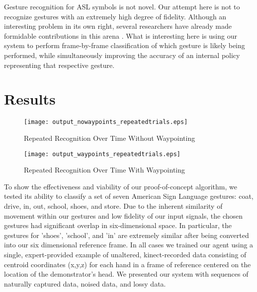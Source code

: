\documentclass[letterpaper]{article}
\begin{document}
Gesture recognition for ASL symbols is not novel.  Our attempt here is not to recognize gestures with an extremely high degree of fidelity.  Although an interesting problem in its own right, several researchers have already made formidable contributions in this arena \cite{HandGestures,HSMMRecognition,POMDPGesture,HoughASL,ASLRealTime,MotionASL}.  What is interesting here is using our system to perform frame-by-frame classification of which gesture is likely being performed, while simultaneously improving the accuracy of an internal policy representing that respective gesture.

\section{Results}
\label{sec:result}

\begin{figure}
\begin{center}
\texttt{[image: output\_nowaypoints\_repeatedtrials.eps]}
\caption{Repeated Recognition Over Time Without Waypointing}
\label{fig:output_nowaypoints_repeatedtrials}
\end{center}
\end{figure}

\begin{figure}
\begin{center}
\texttt{[image: output\_waypoints\_repeatedtrials.eps]}
\caption{Repeated Recognition Over Time With Waypointing}
\label{fig:output_waypoints_repeatedtrials}
\end{center}
\end{figure}

To show the effectiveness and viability of our proof-of-concept algorithm, we tested its ability to classify a set of seven American Sign Language gestures: coat, drive, in, out, school, shoes, and store. Due to the inherent similarity of movement within our gestures and low fidelity of our input signals, the chosen gestures had significant overlap in six-dimensional space. In particular, the gestures for 'shoes', 'school', and 'in' are extremely similar after being converted into our six dimensional reference frame. In all cases we trained our agent using a single, expert-provided example of unaltered, kinect-recorded data consisting of centroid coordinates (x,y,z) for each hand in a frame of reference centered on the location of the demonstrator's head. We presented our system with sequences of naturally captured data, noised data, and lossy data. 
\end{document}
